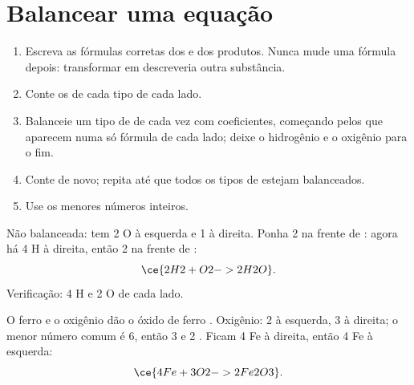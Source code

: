 \section{Balancear uma equação}

\begin{method}\label{met:g8:balanced-equations:balance}
\begin{enumerate}
  \item Escreva as fórmulas corretas dos  e dos produtos. Nunca
        mude uma fórmula depois: transformar  em 
        descreveria outra substância.
  \item Conte os  de cada tipo de cada lado.
  \item Balanceie um tipo de  de cada vez com coeficientes,
        começando pelos  que aparecem numa só fórmula de cada lado;
        deixe o hidrogênio e o oxigênio para o fim.
  \item Conte de novo; repita até que todos os tipos de  estejam
        balanceados.
  \item Use os menores números inteiros.
\end{enumerate}
\end{method}

\begin{example}\label{ex:g8:balanced-equations:water}
Não balanceada:  %
tem 2 O à esquerda e 1 à direita. Ponha 2 na frente de : agora
há 4 H à direita, então 2 na frente de :
\[
  \ce{2H2 + O2 -> 2H2O}.
\]
Verificação: 4 H e 2 O de cada lado.
\end{example}

\begin{example}\label{ex:g8:balanced-equations:iron-oxide}
O ferro e o oxigênio dão o óxido de ferro . Oxigênio: 2 à
esquerda, 3 à direita; o menor número comum é 6, então 3  e 2
. Ficam 4 Fe à direita, então 4 Fe à esquerda:
\[
  \ce{4Fe + 3O2 -> 2Fe2O3}.
\]
\end{example}

